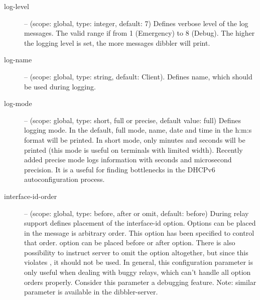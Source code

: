 \begin{description}
 \item[log-level] -- (scope: global, type: integer, default: 7) Defines
	    verbose level of the log messages. The valid range if
	    from 1 (Emergency) to 8 (Debug). The higher the logging
	    level is set, the more messages dibbler will print.
 \item[log-name] -- (scope: global, type: string, default: Client). Defines 
	    name, which should be used during logging.
 \item[log-mode] -- (scope: global, type: short, full or precise,
	    default value: full) Defines logging mode. In the
	    default, full mode, name, date and time in the h:m:s format
	    will be printed. In short mode, only minutes and
	    seconds will be printed (this mode is useful on
	    terminals with limited width). Recently added precise
	    mode logs information with seconds and microsecond
	    precision. It is a useful for finding bottlenecks in
	    the DHCPv6 autoconfiguration process.
\item[interface-id-order] -- (scope: global, type: before, after or omit, 
        default: before) During relay support defines placement of the
        interface-id option. Options can be placed in the 
        message is arbitrary order. This option has been specified to control
        that order.  option can be placed before or after
         option. There is also possibility to instruct
        server to omit the  option altogether, but since 
        this violates \cite{rfc3315}, it should not be used. In general, this
        configuration parameter is only useful when dealing with buggy relays,
        which can't handle all option orders properly. Consider this parameter
        a debugging feature. Note: similar parameter is available in the dibbler-server. 


\end{description}

